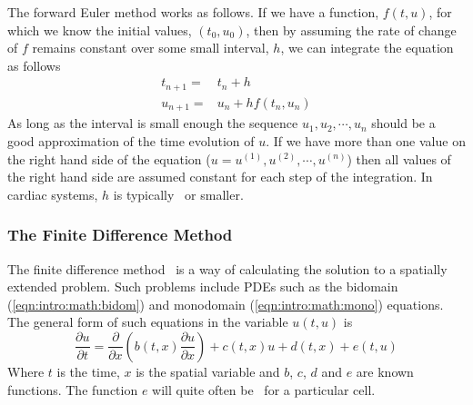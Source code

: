 The forward Euler method works as follows.
If we have a function, $f(t, u)$, for which we know the initial
values, $(t_0, u_0)$, then by assuming the rate of change of $f$ remains constant
over some small interval, $h$, we can integrate the equation as follows
\begin{subequations}
\label{eqn:intro:euler}
\begin{align}
t_{n+1} = & t_n + h \label{eqn:intro:euler:t} \\
u_{n+1} = & u_n + hf(t_n, u_n) \label{eqn:intro:euler:x}
\end{align}
\end{subequations}
As long as the interval is small enough the sequence $u_1,u_2,\cdots,u_n$
should be a good approximation of the time evolution of $u$.
If we have more than one value on the right hand side of the equation ($u =
u^{(1)}, u^{(2)}, \cdots, u^{(n)}$) then all values of the right hand side are
assumed constant for each step of the integration.
In cardiac systems, $h$ is typically \ or smaller.

\subsubsection{The Finite Difference Method}

The finite difference method~\cite{Morton2005} is a way of calculating the
solution to a spatially extended problem.
Such problems include PDEs such as the bidomain (\ref{eqn:intro:math:bidom}) and
monodomain (\ref{eqn:intro:math:mono}) equations.
The general form of such equations in the variable $u(t, u)$ is
\begin{equation}
\label{eqn:intro:fd:partial}
\frac{\partial u}{\partial t} = \frac{\partial}{\partial x} \left( b(t, x)
\frac{\partial u}{\partial x} \right) + c(t, x)u + d(t, x) + e(t, u)
\end{equation}
Where $t$ is the time, $x$ is the spatial variable and $b$, $c$, $d$ and $e$ are
known functions.
The function $e$ will quite often be \ for a particular cell.

